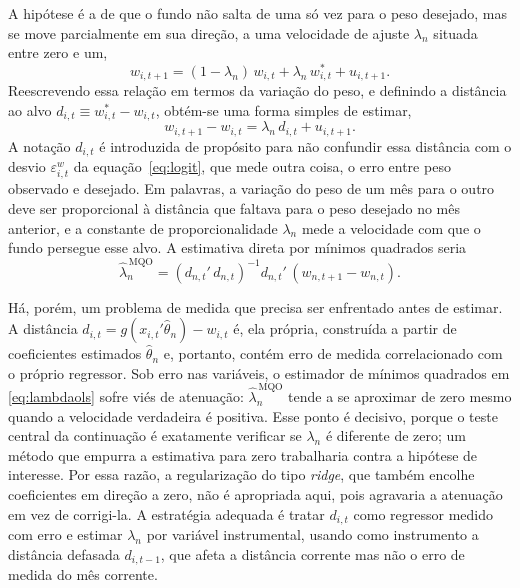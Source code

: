 \documentclass[12pt,a4paper]{article}
\begin{document}
A hipótese é a de que o fundo não salta de uma só vez para o peso desejado, mas se move
parcialmente em sua direção, a uma velocidade de ajuste $\lambda_n$ situada entre zero e um,
\begin{equation}
w_{i,t+1} = (1-\lambda_n)\,w_{i,t} + \lambda_n\,w^{*}_{i,t} + u_{i,t+1}.
\label{eq:pa1}
\end{equation}
Reescrevendo essa relação em termos da variação do peso, e definindo a distância ao alvo
$d_{i,t}\equiv w^{*}_{i,t}-w_{i,t}$, obtém-se uma forma simples de estimar,
\begin{equation}
w_{i,t+1}-w_{i,t} = \lambda_n\,d_{i,t} + u_{i,t+1}.
\label{eq:pa2}
\end{equation}
A notação $d_{i,t}$ é introduzida de propósito para não confundir essa distância com o desvio
$\varepsilon^{w}_{i,t}$ da equação~\eqref{eq:logit}, que mede outra coisa, o erro entre peso
observado e desejado. Em palavras, a variação do peso de um mês para o outro deve ser
proporcional à distância que faltava para o peso desejado no mês anterior, e a constante de
proporcionalidade $\lambda_n$ mede a velocidade com que o fundo persegue esse alvo. A estimativa
direta por mínimos quadrados seria
\begin{equation}
\widehat{\lambda}^{\,\text{MQO}}_n = \left(d_{n,t}'\,d_{n,t}\right)^{-1}d_{n,t}'\,(w_{n,t+1}-w_{n,t}).
\label{eq:lambdaols}
\end{equation}

Há, porém, um problema de medida que precisa ser enfrentado antes de estimar. A distância
$d_{i,t}=g(x_{i,t}'\widehat{\theta}_n)-w_{i,t}$ é, ela própria, construída a partir de
coeficientes estimados $\widehat{\theta}_n$ e, portanto, contém erro de medida correlacionado com
o próprio regressor. Sob erro nas variáveis, o estimador de mínimos quadrados em
\eqref{eq:lambdaols} sofre viés de atenuação: $\widehat{\lambda}^{\,\text{MQO}}_n$ tende a se
aproximar de zero mesmo quando a velocidade verdadeira é positiva. Esse ponto é decisivo, porque
o teste central da continuação é exatamente verificar se $\lambda_n$ é diferente de zero; um
método que empurra a estimativa para zero trabalharia contra a hipótese de interesse. Por essa
razão, a regularização do tipo \emph{ridge}, que também encolhe coeficientes em direção a zero,
não é apropriada aqui, pois agravaria a atenuação em vez de corrigi-la. A estratégia adequada é
tratar $d_{i,t}$ como regressor medido com erro e estimar $\lambda_n$ por variável instrumental,
usando como instrumento a distância defasada $d_{i,t-1}$, que afeta a distância corrente mas não o
erro de medida do mês corrente.
\end{document}
